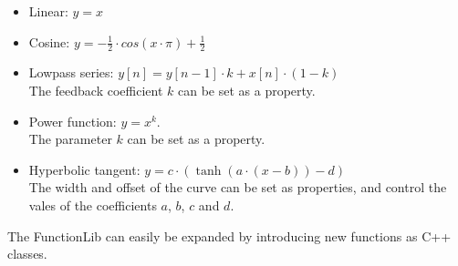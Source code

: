 \documentclass{article}
\begin{document}
\begin{itemize}
	\item Linear: $y = x$
	\item Cosine: $y = - \frac{1}{2} \cdot cos(x \cdot \pi ) + \frac{1}{2} $
	\item Lowpass series: $y[n] = y[n-1] \cdot k + x[n] \cdot (1-k)$ \\ The feedback coefficient $k$ can be set as a property.
	\item Power function: $ y = x^{k} $. \\ The parameter $k$ can be set as a property.
	\item Hyperbolic tangent: $ y = c \cdot (\tanh(a\cdot(x-b)) - d) $ \\ The width and offset of the curve can be set as properties, and control the vales of the coefficients $a$, $b$, $c$ and $d$.
\end{itemize}

The FunctionLib can easily be expanded by introducing new functions as C++ classes.




\end{document}
